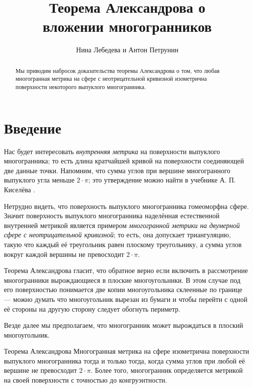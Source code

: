 \documentclass[oneside,a4paper]{article}
\begin{document}
\pagestyle{empty}

\title{Теорема Александрова о\\ вложении многогранников}
\author{Нина Лебедева и Антон Петрунин}
\date{}
\maketitle

\begin{abstract}
Мы приводим набросок доказательства теоремы Александрова о том, что любая многогранная метрика на сфере с неотрицательной кривизной изометрична поверхности некоторого выпуклого многогранника.
\end{abstract}

\section{Введение}

Нас будет интересовать \emph{внутренняя метрика} на поверхности выпуклого многогранника;
то есть длина кратчайшей кривой на поверхности соединяющей две данные точки.
Напомним, что сумма углов при вершине многогранного выпуклого угла меньше $2\cdot \pi$; это утверждение можно найти в учебнике А. П. Киселёва \cite[§~325]{kiselyov}.

Нетрудно видеть, что поверхность выпуклого многогранника гомеоморфна сфере.
Значит поверхность выпуклого многогранника наделённая естественной внутренней метрикой
является примером \emph{многогранной метрики на двумерной сфере с неотрицательной кривизной}; то есть,
она допускает триангуляцию, 
такую что каждый её треугольник равен плоскому треугольнику, а сумма углов вокруг каждой вершины не превосходит $2\cdot\pi$.

Теорема Александрова гласит, что обратное верно если включить в рассмотрение многогранники вырождающиеся в плоские многоугольники.
В этом случае под его поверхностью понимается две копии многоугольника склеенные по границе
--- можно думать что многоугольник вырезан из бумаги и чтобы перейти с одной её стороны на другую сторону следует обогнуть периметр.

Везде далее мы предполагаем, что многогранник может вырождаться в плоский многоугольник.


\begin{thm}{Теорема Александрова}
Многогранная метрика на сфере изометрична поверхности выпуклого многогранника тогда и только тогда, когда сумма углов при любой её вершине не превосходит $2\cdot\pi$.
Более того, многогранник определяется метрикой на своей поверхности с точностью до конгруэнтности.
\end{thm}
\end{document}
